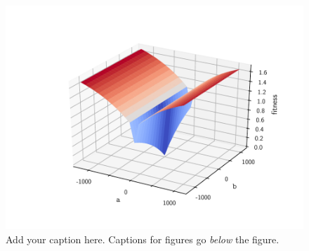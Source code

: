 %
%
%
\begin{figure}[t]
    \centering

    \includegraphics[width=\columnwidth]{graphics/figure.pdf}

    \caption{
        \label{fig:plain-figure}
        Add your caption here. Captions for figures go {\em below}
        the figure.
    }
\end{figure}